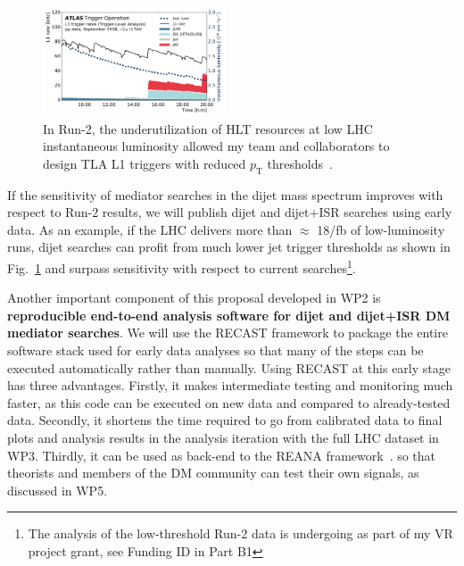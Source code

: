 \begin{figure} 
\begin{center}
\includegraphics[width=0.48\textwidth]{figs_B2/TLAPublicWinter2019_L1Lumi.pdf}
\caption{\color{black}\label{fig:triggerLowThreshold} \small In Run-2, the underutilization of HLT resources at low LHC instantaneous luminosity allowed my team and collaborators to design TLA L1 triggers with reduced $p_\mathrm{T}$ thresholds~\cite{ToBeCited}.} %
\vskip2pt
\end{center}
\end{figure}

If the sensitivity of mediator searches in the dijet mass spectrum improves with respect to Run-2 results, we will publish dijet and dijet+ISR searches using early data.
As an example, if the LHC delivers more than $\approx$ 18/fb of low-luminosity runs, dijet searches can profit from much lower jet trigger thresholds as shown in Fig.~\ref{fig:triggerLowThreshold} and surpass sensitivity with respect to current searches\footnote{The analysis of the low-threshold Run-2 data is undergoing as part of my VR project grant, see Funding ID in Part B1}. 

Another important component of this proposal developed in WP2 is \textbf{reproducible end-to-end analysis software for dijet and dijet+ISR DM mediator searches}. 
We will use the RECAST framework to package the entire software stack used for early data analyses so that many of the steps can be executed automatically rather than manually.
Using RECAST at this early stage has three advantages. 
Firstly, it makes intermediate testing and monitoring much faster, as this code can be executed on new data and compared to already-tested data. 
Secondly, it shortens the time required to go from calibrated data to final plots and analysis results in the analysis iteration with the full LHC dataset in WP3.
Thirdly, it can be used as back-end to the REANA framework~\cite{ToBeCited}. %
so that theorists and members of the DM community can test their own signals, as discussed in WP5.  

